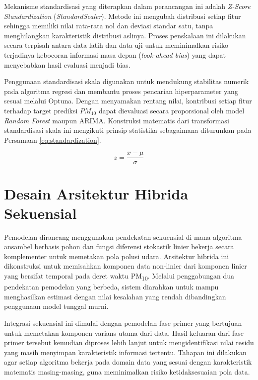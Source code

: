 Mekanisme standardisasi yang diterapkan dalam perancangan ini adalah \textit{Z-Score Standardization} (\textit{StandardScaler}). Metode ini mengubah distribusi setiap fitur sehingga memiliki nilai rata-rata nol dan deviasi standar satu, tanpa menghilangkan karakteristik distribusi aslinya. Proses penskalaan ini dilakukan secara terpisah antara data latih dan data uji untuk meminimalkan risiko terjadinya kebocoran informasi masa depan (\textit{look-ahead bias}) yang dapat menyebabkan hasil evaluasi menjadi bias.

Penggunaan standardisasi skala digunakan untuk mendukung stabilitas numerik pada algoritma regresi dan membantu proses pencarian hiperparameter yang sesuai melalui Optuna. Dengan menyamakan rentang nilai, kontribusi setiap fitur terhadap target prediksi $PM_{10}$ dapat dievaluasi secara proporsional oleh model \textit{Random Forest} maupun ARIMA. Konstruksi matematis dari transformasi standardisasi skala ini mengikuti prinsip statistika sebagaimana diturunkan pada Persamaan \ref{eq:standardization}.

\begin{equation}
z = \frac{x - \mu}{\sigma}
\label{eq:standardization}
\end{equation}

\section{Desain Arsitektur Hibrida Sekuensial}

Pemodelan dirancang menggunakan pendekatan sekuensial di mana algoritma ansambel berbasis pohon dan fungsi diferensi stokastik linier bekerja secara komplementer untuk memetakan pola polusi udara. Arsitektur hibrida ini dikonstruksi untuk memisahkan komponen data non-linier dari komponen linier yang bersifat temporal pada deret waktu PM\textsubscript{10}. Melalui penggabungan dua pendekatan pemodelan yang berbeda, sistem diarahkan untuk mampu menghasilkan estimasi dengan nilai kesalahan yang rendah dibandingkan penggunaan model tunggal murni.

Integrasi sekuensial ini dimulai dengan pemodelan fase primer yang bertujuan untuk memetakan komponen varians utama dari data. Hasil keluaran dari fase primer tersebut kemudian diproses lebih lanjut untuk mengidentifikasi nilai residu yang masih menyimpan karakteristik informasi tertentu. Tahapan ini dilakukan agar setiap algoritma bekerja pada domain data yang sesuai dengan karakteristik matematis masing-masing, guna meminimalkan risiko ketidaksesuaian pola data.

